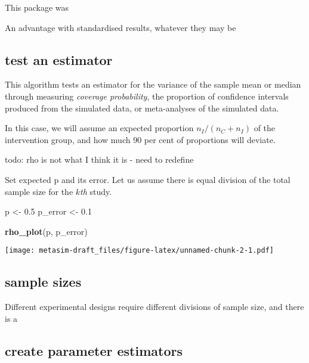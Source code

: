 \documentclass[]{article}
\newenvironment{Shaded}{\begin{snugshade}}{\end{snugshade}}
\newcommand{\FloatTok}[1]{\textcolor[rgb]{0.00,0.00,0.81}{#1}}
\newcommand{\KeywordTok}[1]{\textcolor[rgb]{0.13,0.29,0.53}{\textbf{#1}}}
\newcommand{\NormalTok}[1]{#1}
\newcommand{\StringTok}[1]{\textcolor[rgb]{0.31,0.60,0.02}{#1}}
\begin{document}
This package was

An advantage with standardised results, whatever they may be

\hypertarget{test-an-estimator}{%
\subsection{test an estimator}\label{test-an-estimator}}

This algorithm tests an estimator for the variance of the sample mean or
median through measuring \emph{coverage probability}, the proportion of
confidence intervals produced from the simulated data, or meta-analyses
of the simulated data.

In this case, we will assume an expected proportion
\(n_I / (n_C + n_I)\) of the intervention group, and how much 90 per
cent of proportions will deviate.

todo: rho is not what I think it is - need to redefine

Set expected p and its error. Let us assume there is equal division of
the total sample size for the \(k\)\emph{th} study.

\begin{Shaded}
\begin{Highlighting}[]
\NormalTok{p <-}\StringTok{ }\FloatTok{0.5} 
\NormalTok{p_error <-}\StringTok{ }\FloatTok{0.1}   
\end{Highlighting}
\end{Shaded}

\begin{Shaded}
\begin{Highlighting}[]
\KeywordTok{rho_plot}\NormalTok{(p, p_error)}
\end{Highlighting}
\end{Shaded}

\texttt{[image: metasim-draft\_files/figure-latex/unnamed-chunk-2-1.pdf]}

\hypertarget{sample-sizes}{%
\subsection{sample sizes}\label{sample-sizes}}

Different experimental designs require different divisions of sample
size, and there is a

\hypertarget{create-parameter-estimators}{%
\subsection{create parameter
estimators}\label{create-parameter-estimators}}
\end{document}
